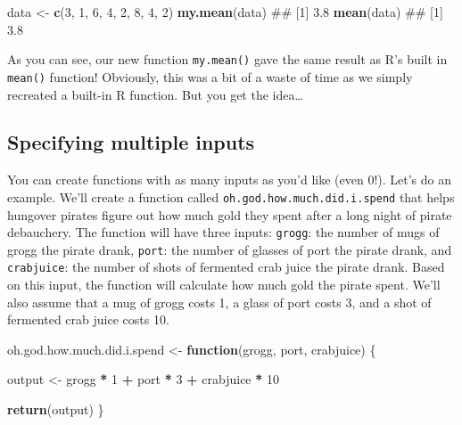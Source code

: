 \documentclass[]{book}
\newenvironment{Shaded}{\begin{snugshade}}{\end{snugshade}}
\newcommand{\KeywordTok}[1]{\textcolor[rgb]{0.13,0.29,0.53}{\textbf{#1}}}
\newcommand{\DecValTok}[1]{\textcolor[rgb]{0.00,0.00,0.81}{#1}}
\newcommand{\StringTok}[1]{\textcolor[rgb]{0.31,0.60,0.02}{#1}}
\newcommand{\ControlFlowTok}[1]{\textcolor[rgb]{0.13,0.29,0.53}{\textbf{#1}}}
\newcommand{\OperatorTok}[1]{\textcolor[rgb]{0.81,0.36,0.00}{\textbf{#1}}}
\newcommand{\NormalTok}[1]{#1}
\theoremstyle{definition}
\theoremstyle{definition}
\theoremstyle{remark}
\begin{document}
\begin{Shaded}
\begin{Highlighting}[]
\NormalTok{data <-}\StringTok{ }\KeywordTok{c}\NormalTok{(}\DecValTok{3}\NormalTok{, }\DecValTok{1}\NormalTok{, }\DecValTok{6}\NormalTok{, }\DecValTok{4}\NormalTok{, }\DecValTok{2}\NormalTok{, }\DecValTok{8}\NormalTok{, }\DecValTok{4}\NormalTok{, }\DecValTok{2}\NormalTok{)}
\KeywordTok{my.mean}\NormalTok{(data)}
\NormalTok{## [1] 3.8}
\KeywordTok{mean}\NormalTok{(data)}
\NormalTok{## [1] 3.8}
\end{Highlighting}
\end{Shaded}

As you can see, our new function \texttt{my.mean()} gave the same result
as R's built in \texttt{mean()} function! Obviously, this was a bit of a
waste of time as we simply recreated a built-in R function. But you get
the idea\ldots{}

\subsection{Specifying multiple
inputs}\label{specifying-multiple-inputs}

You can create functions with as many inputs as you'd like (even 0!).
Let's do an example. We'll create a function called
\texttt{oh.god.how.much.did.i.spend} that helps hungover pirates figure
out how much gold they spent after a long night of pirate debauchery.
The function will have three inputs: \texttt{grogg}: the number of mugs
of grogg the pirate drank, \texttt{port}: the number of glasses of port
the pirate drank, and \texttt{crabjuice}: the number of shots of
fermented crab juice the pirate drank. Based on this input, the function
will calculate how much gold the pirate spent. We'll also assume that a
mug of grogg costs 1, a glass of port costs 3, and a shot of fermented
crab juice costs 10.

\begin{Shaded}
\begin{Highlighting}[]
\NormalTok{oh.god.how.much.did.i.spend <-}\StringTok{ }\ControlFlowTok{function}\NormalTok{(grogg,}
\NormalTok{                                        port,}
\NormalTok{                                        crabjuice) \{}

\NormalTok{  output <-}\StringTok{ }\NormalTok{grogg }\OperatorTok{*}\StringTok{ }\DecValTok{1} \OperatorTok{+}\StringTok{ }\NormalTok{port }\OperatorTok{*}\StringTok{ }\DecValTok{3} \OperatorTok{+}\StringTok{ }\NormalTok{crabjuice }\OperatorTok{*}\StringTok{ }\DecValTok{10}

  \KeywordTok{return}\NormalTok{(output)}
\NormalTok{\}}
\end{Highlighting}
\end{Shaded}
\end{document}
